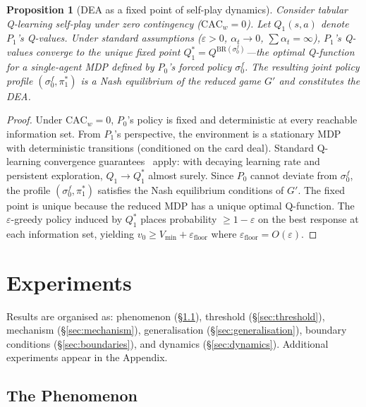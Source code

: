 \documentclass{article}
\newtheorem{proposition}{Proposition}
\begin{document}
\begin{proposition}[DEA as a fixed point of self-play dynamics]
\label{prop:dea}
Consider tabular Q-learning self-play under zero contingency ($\text{CAC}_w = 0$). Let $Q_1(s,a)$ denote $P_1$'s Q-values. Under standard assumptions ($\varepsilon > 0$, $\alpha_t \to 0$, $\sum \alpha_t = \infty$), $P_1$'s Q-values converge to the unique fixed point $Q_1^* = Q^{\text{BR}(\sigma_0^f)}$---the optimal Q-function for a single-agent MDP defined by $P_0$'s forced policy $\sigma_0^f$. The resulting joint policy profile $(\sigma_0^f, \pi_1^*)$ is a Nash equilibrium of the reduced game $G'$ and constitutes the DEA.
\end{proposition}

\begin{proof}
Under $\text{CAC}_w = 0$, $P_0$'s policy is fixed and deterministic at every reachable information set. From $P_1$'s perspective, the environment is a stationary MDP with deterministic transitions (conditioned on the card deal). Standard Q-learning convergence guarantees~\citep{tesauro1994td} apply: with decaying learning rate and persistent exploration, $Q_1 \to Q_1^*$ almost surely. Since $P_0$ cannot deviate from $\sigma_0^f$, the profile $(\sigma_0^f, \pi_1^*)$ satisfies the Nash equilibrium conditions of $G'$. The fixed point is unique because the reduced MDP has a unique optimal Q-function. The $\varepsilon$-greedy policy induced by $Q_1^*$ places probability $\geq 1 - \varepsilon$ on the best response at each information set, yielding $v_0 \geq V_{\min} + \varepsilon_{\text{floor}}$ where $\varepsilon_{\text{floor}} = O(\varepsilon)$.
\end{proof}

\section{Experiments}

Results are organised as: phenomenon (\S\ref{sec:phenomenon}), threshold (\S\ref{sec:threshold}), mechanism (\S\ref{sec:mechanism}), generalisation (\S\ref{sec:generalisation}), boundary conditions (\S\ref{sec:boundaries}), and dynamics (\S\ref{sec:dynamics}). Additional experiments appear in the Appendix.

\FloatBarrier
\subsection{The Phenomenon}
\label{sec:phenomenon}
\end{document}

